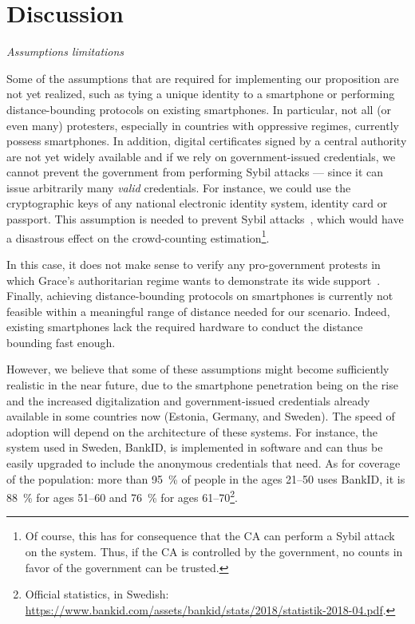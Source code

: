 \section{Discussion}%
\label{Discussion}

\emph{Assumptions limitations} 

Some of the assumptions that are required for implementing our proposition are not yet realized, such as tying a unique identity to a smartphone or performing distance-bounding protocols on existing smartphones. 
In particular, not all (or even many) protesters, especially in countries with oppressive regimes, currently possess smartphones.
In addition, digital certificates signed by a central authority are not yet widely available and if we rely on government-issued credentials, we cannot prevent the government from performing Sybil attacks --- since it can issue arbitrarily many \emph{valid} credentials.  For instance, we could use the cryptographic keys of any national electronic identity system, identity card or passport.
This assumption is needed to prevent Sybil attacks~\cite{SybilAttack}, which would have a disastrous effect on the crowd-counting estimation\footnote{
Of course, this has for consequence that the \ac{CA} can perform a Sybil attack on the system.
Thus, if the \ac{CA} is controlled by the government, no counts in favor of the government can be trusted.
}.

In this case, it does not make sense to verify any pro-government protests in which Grace's authoritarian regime wants to demonstrate its wide support~\cite{AlJazeeraOnVenezuela2017,VenezuelanStateWorkersCalledToParticipate}.
Finally, achieving distance-bounding protocols on smartphones is currently not feasible within a meaningful range of distance needed for our scenario.
Indeed, existing smartphones lack the required hardware to conduct the distance bounding fast enough.

However, we believe that some of these assumptions might become sufficiently realistic in the near future, due to the smartphone penetration being on the rise and the increased digitalization and government-issued credentials already available in some countries now (\eg Estonia, Germany, and Sweden). 
The speed of adoption will depend on the architecture of these systems.
For instance, the system used in Sweden, BankID, is implemented in software and can thus be easily upgraded to include the anonymous credentials that \CROCUS need.
As for coverage of the population: more than \SI{95}{\%} of people in the ages 21--50 uses BankID, it is \SI{88}{\%} for ages 51--60 and \SI{76}{\%} for ages 61--70\footnote{Official statistics, in Swedish:  \url{https://www.bankid.com/assets/bankid/stats/2018/statistik-2018-04.pdf}.}.

